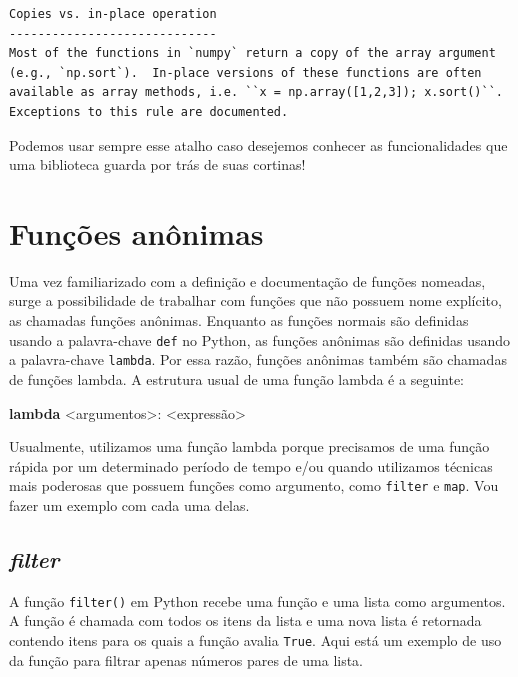 \documentclass[
  brazilian,
  letterpaper,
  DIV=11,
  numbers=noendperiod]{scrreprt}
\newenvironment{Shaded}{\begin{snugshade}}{\end{snugshade}}
\newcommand{\KeywordTok}[1]{\textcolor[rgb]{0.00,0.23,0.31}{\textbf{#1}}}
\newcommand{\NormalTok}[1]{\textcolor[rgb]{0.00,0.23,0.31}{#1}}
\newcommand{\OperatorTok}[1]{\textcolor[rgb]{0.37,0.37,0.37}{#1}}
\begin{document}
\begin{verbatim}
Copies vs. in-place operation
-----------------------------
Most of the functions in `numpy` return a copy of the array argument
(e.g., `np.sort`).  In-place versions of these functions are often
available as array methods, i.e. ``x = np.array([1,2,3]); x.sort()``.
Exceptions to this rule are documented.

\end{verbatim}

Podemos usar sempre esse atalho caso desejemos conhecer as
funcionalidades que uma biblioteca guarda por trás de suas cortinas!

\section{Funções anônimas}\label{funuxe7uxf5es-anuxf4nimas}

Uma vez familiarizado com a definição e documentação de funções
nomeadas, surge a possibilidade de trabalhar com funções que não possuem
nome explícito, as chamadas funções anônimas. Enquanto as funções
normais são definidas usando a palavra-chave \texttt{def} no Python, as
funções anônimas são definidas usando a palavra-chave \texttt{lambda}.
Por essa razão, funções anônimas também são chamadas de funções lambda.
A estrutura usual de uma função lambda é a seguinte:

\begin{Shaded}
\begin{Highlighting}[]
\KeywordTok{lambda} \OperatorTok{\textless{}}\NormalTok{argumentos}\OperatorTok{\textgreater{}}\NormalTok{: }\OperatorTok{\textless{}}\NormalTok{expressão}\OperatorTok{\textgreater{}}
\end{Highlighting}
\end{Shaded}

Usualmente, utilizamos uma função lambda porque precisamos de uma função
rápida por um determinado período de tempo e/ou quando utilizamos
técnicas mais poderosas que possuem funções como argumento, como
\texttt{filter} e \texttt{map}. Vou fazer um exemplo com cada uma delas.

\subsection{\texorpdfstring{\emph{filter}}{filter}}\label{filter}

A função \texttt{filter()} em Python recebe uma função e uma lista como
argumentos. A função é chamada com todos os itens da lista e uma nova
lista é retornada contendo itens para os quais a função avalia
\texttt{True}. Aqui está um exemplo de uso da função para filtrar apenas
números pares de uma lista.
\end{document}
